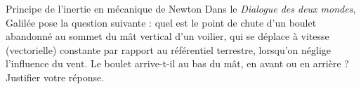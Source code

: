 \begin{exo}[PC][1][colle]{Principe de l'inertie en mécanique de Newton}
Dans le \textit{Dialogue des deux mondes}, Galilée pose la question suivante : quel est le point de chute d'un boulet  abandonné au sommet du mât vertical d'un voilier, qui se déplace à vitesse (vectorielle) constante par rapport au référentiel terrestre, lorsqu'on néglige l'influence du vent. Le boulet arrive-t-il au bas du mât, en avant ou en arrière ? Justifier votre réponse.

\end{exo}


